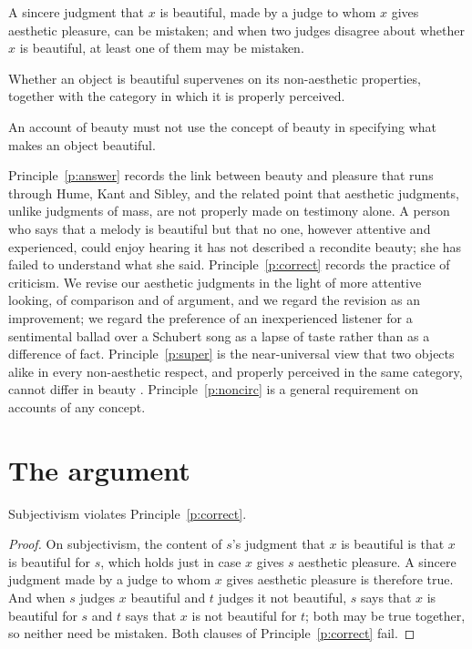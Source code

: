 \documentclass{situationist-preprint}
\begin{document}
\begin{principle}[Correctability]\label{p:correct}
A sincere judgment that $x$ is beautiful, made by a judge to whom $x$ gives aesthetic pleasure, can be mistaken; and when two judges disagree about whether $x$ is beautiful, at least one of them may be mistaken.
\end{principle}

\begin{principle}[Supervenience]\label{p:super}
Whether an object is beautiful supervenes on its non-aesthetic properties, together with the category in which it is properly perceived.
\end{principle}

\begin{principle}\label{p:noncirc}
An account of beauty must not use the concept of beauty in specifying what makes an object beautiful.
\end{principle}

Principle~\ref{p:answer} records the link between beauty and pleasure that runs through Hume, Kant and Sibley, and the related point that aesthetic judgments, unlike judgments of mass, are not properly made on testimony alone. A person who says that a melody is beautiful but that no one, however attentive and experienced, could enjoy hearing it has not described a recondite beauty; she has failed to understand what she said. Principle~\ref{p:correct} records the practice of criticism. We revise our aesthetic judgments in the light of more attentive looking, of comparison and of argument, and we regard the revision as an improvement; we regard the preference of an inexperienced listener for a sentimental ballad over a Schubert song as a lapse of taste rather than as a difference of fact. Principle~\ref{p:super} is the near-universal view that two objects alike in every non-aesthetic respect, and properly perceived in the same category, cannot differ in beauty \citep{Sibley1959,Zangwill2001}. Principle~\ref{p:noncirc} is a general requirement on accounts of any concept.

\section{The argument}

\begin{lemma}\label{l:subj}
Subjectivism violates Principle~\ref{p:correct}.
\end{lemma}

\begin{proof}
On subjectivism, the content of $s$'s judgment that $x$ is beautiful is that $x$ is beautiful for $s$, which holds just in case $x$ gives $s$ aesthetic pleasure. A sincere judgment made by a judge to whom $x$ gives aesthetic pleasure is therefore true. And when $s$ judges $x$ beautiful and $t$ judges it not beautiful, $s$ says that $x$ is beautiful for $s$ and $t$ says that $x$ is not beautiful for $t$; both may be true together, so neither need be mistaken. Both clauses of Principle~\ref{p:correct} fail.
\end{proof}
\end{document}
